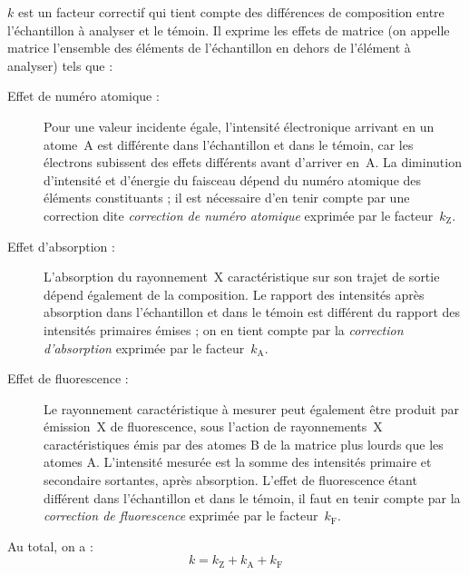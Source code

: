 $k$ est un facteur correctif qui tient compte des différences de 
composition entre l'échantillon à analyser et le témoin. Il exprime 
les effets de matrice (on appelle matrice l'ensemble des éléments de 
l'échantillon en dehors de l'élément à analyser) tels que :

\begin{description}
  \item [Effet de numéro atomique :] Pour une valeur incidente 
        égale, l'intensité électronique arrivant en un atome~A est 
        différente dans l'échantillon et dans le témoin, car les 
        électrons subissent des effets différents avant d'arriver en~A.
        La diminution d'intensité et d'énergie du faisceau dépend du 
        numéro atomique des éléments constituants ; il est nécessaire 
        d'en tenir compte par une correction dite \emph{correction de 
        numéro atomique} exprimée par le facteur~$k_\text{Z}$.
  \item [Effet d'absorption :] L'absorption du rayonnement~X 
        caractéristique sur son trajet de sortie dépend également 
        de la composition. Le rapport des intensités après absorption
        dans l'échantillon et dans le témoin est différent du rapport 
        des intensités primaires émises ; on en tient compte par 
        la \emph{correction d'absorption} exprimée par le
        facteur~$k_\text{A}$.
  \item [Effet de fluorescence :] Le rayonnement caractéristique 
        à mesurer peut également être produit par émission~X de 
        fluorescence, sous l'action de rayonnements~X caractéristiques 
        émis par des atomes B de la matrice plus lourds que les atomes 
        A. L'intensité mesurée est la somme des intensités primaire et 
        secondaire sortantes, après absorption. L'effet de 
        fluorescence étant différent dans l'échantillon et dans le 
        témoin, il faut en tenir compte par la \emph{correction de 
        fluorescence} exprimée par le facteur~$k_\text{F}$.
\end{description}

Au total, on a : 
\begin{equation}
  k = k_\text{Z} + k_\text{A} + k_\text{F}
\end{equation}

